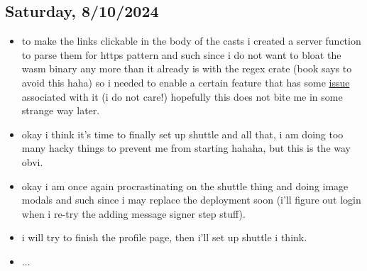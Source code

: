 \subsection*{Saturday, 8/10/2024}
\begin{itemize}
    \item to make the links clickable in the body of the casts i created a
        server function to parse them for https pattern and such since i do not
        want to bloat the wasm binary any more than it already is with the regex
        crate (book says to avoid this haha) so i needed to enable a certain
        feature that has some 
        \textcolor{blue}{\href{https://github.com/rust-lang/rust/issues/79524}{issue}}
        associated with it (i do not care!)
        hopefully this does not bite me in some strange way later.
    \item okay i think it's time to finally set up shuttle and all that, i am
        doing too many hacky things to prevent me from starting hahaha, but this
        is the way obvi.
    \item okay i am once again procrastinating on the shuttle thing and doing
        image modals and such since i may replace the deployment soon (i'll
        figure out login when i re-try the adding message signer step stuff).
    \item i will try to finish the profile page, then i'll set up shuttle i
        think.
    \item ...
\end{itemize}
